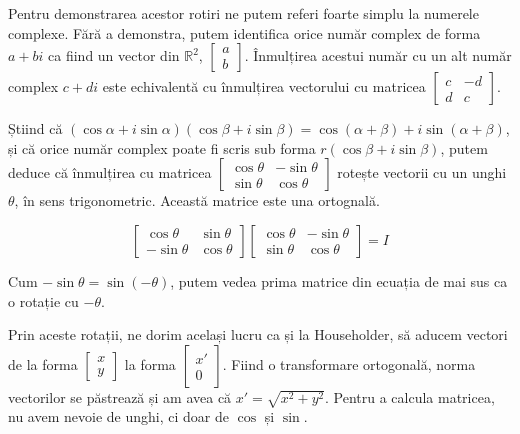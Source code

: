 \documentclass{exam}
\begin{document}
\par Pentru demonstrarea acestor rotiri ne putem referi foarte simplu la numerele
complexe. Fără a demonstra, putem identifica orice număr complex de forma $a + bi$
ca fiind un vector din $\mathbb{R}^2$, $\begin{bmatrix} a \\ b \end{bmatrix}$.
Înmulțirea acestui număr cu un alt număr complex $c + di$ este echivalentă cu
înmulțirea vectorului cu matricea $\begin{bmatrix} c & -d \\ d & c \end{bmatrix}$.

\par Știind că $ (\cos \alpha + i \sin \alpha)(\cos \beta + i \sin \beta) = \cos(\alpha + \beta) + i \sin(\alpha + \beta)$,
și că orice număr complex poate fi scris sub forma $r(\cos \beta + i \sin \beta)$,
putem deduce că înmulțirea cu matricea $\begin{bmatrix} \cos \theta & -\sin \theta \\ \sin \theta & \cos \theta \end{bmatrix}$
rotește vectorii cu un unghi $\theta$, în sens trigonometric. Această matrice
este una ortognală.

\begin{equation*}
	\begin{bmatrix} \cos \theta & \sin \theta \\ -\sin \theta & \cos \theta \end{bmatrix} \begin{bmatrix} \cos \theta & -\sin \theta \\ \sin \theta & \cos \theta \end{bmatrix} = I
\end{equation*}

Cum $-\sin \theta = \sin(-\theta)$, putem vedea prima matrice din ecuația de mai
sus ca o rotație cu $-\theta$.

\par Prin aceste rotații, ne dorim același lucru ca și la Householder, să aducem
vectori de la forma $\begin{bmatrix} x \\ y \end{bmatrix}$ la forma
$\begin{bmatrix} x' \\ 0 \end{bmatrix}$. Fiind o transformare ortogonală, norma
vectorilor se păstrează și am avea că $x' = \sqrt{x^2 + y^2}$. Pentru a calcula
matricea, nu avem nevoie de unghi, ci doar de $\cos$ și $\sin$.
\end{document}

